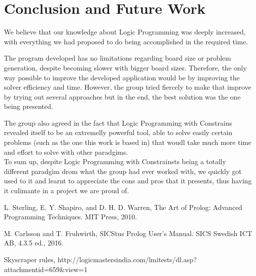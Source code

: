 \documentclass{llncs}
\begin{document}
%
\section{Conclusion and Future Work}

We believe that our knowledge about Logic Programming was deeply increased, with everything we had proposed to do being accomplished in the required time.

The program developed has no limitations regarding board size or problem generation, despite becoming slower with bigger board sizes. Therefore, the only way possible to improve the developed application would be by improving the solver efficiency and time. However, the group tried fiercely to make that improve by trying out several approaches but in the end, the best solution was the one being presented.

The group also agreed in the fact that Logic Programming with Constrains revealed itself to be an extremelly powerful tool, able to solve easily certain problems (such as the one this work is based in) that woudl take much more time and effort to solve with other paradgims.\\

To sum up, despite Logic Programming with Constrainsts being a totally different paradgim drom what the group had ever worked with, we quickly got used to it and learnt to appreciate the cons and pros that it presents, thus having it culimante in a project we are proud of.

%


%
%
\begin{thebibliography}{5}
%
L. Sterling, E. Y. Shapiro, and D. H. D. Warren, The Art of Prolog: Advanced Programming Techniques. MIT Press, 2010.

M. Carlsson and T. Fruhwirth, SICStus Prolog User's Manual. SICS Swedish ICT AB, 4.3.5 ed., 2016.

Skyscraper rules,
http://logicmastersindia.com/lmitests/dl.asp?attachmentid=659\&view=1

\end{thebibliography}

\appendix
\end{document}
